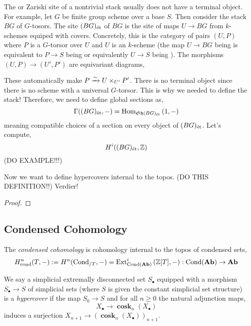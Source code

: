\documentclass[12pt]{article}
\newcommand{\cond}{\text{cond}}
\newcommand{\Cond}{\mathrm{Cond}}
\DeclareMathOperator{\bfcosk}{\mathbf{cosk}}
\begin{document}
\begin{example}
The \etale or Zariski site of a nontrivial stack usually does not have a terminal object. For example, let $G$ be finite \etale group scheme over a base $S$. Then consider the stack $BG$ of $G$-tosors. The \etale site $(BG)_{\text{\'{e}t}}$ of $BG$ is the site of \etale maps $U \to BG$ from $k$-schemes equiped with \etale covers. Concretely, this is the category of pairs $(U, P)$ where $P$ is a $G$-torsor over $U$ and $U$ is an \etale $k$-scheme (the map $U \to BG$ being \etale is equivalent to $P \to S$ being \etale or equivalently $U \to S$ being \etale). The morphisms $(U, P) \to (U', P')$ are equivariant diagrams,
\begin{center}
\end{center}
These automatically make $P \xrightarrow{\sim} U \times_{U'} P'$. There is no terminal object since there is no scheme with a universal $G$-torsor. This is why we needed to define the stack! Therefore, we need to define global sections as,
\[ \Gamma((BG)_{\text{\'{e}t}}, -) = \mathrm{Hom}_{\mathfrak{Sh}{(BG)_{\text{\'{e}t}}}} \left( 1, - \right) \]
meaning compatible choices of a section on every object of $(BG)_{\text{\'{e}t}}$. Let's compute,
\[ H^i((BG)_{\text{\'{e}t}}, \mathbb{Z}) \] 
(DO EXAMPLE!!!)
\end{example}

Now we want to define hypercovers internal to the topos. (DO THIS DEFINITION!!) Verdier!

\begin{proof}

\end{proof}


\subsection{Condensed Cohomology}

\newcommand{\CHaus}{\mathbf{CHaus}}

\begin{defn}
The \textit{condensed cohomology} is cohomology internal to the topos of condensed sets,
\[ H^n_{\cond}(T, -) := H^n(\Cond_{/T}, -) = \Ext{i}{\Cond(\Ab)}{\Z[T]}{-} : \Cond(\Ab) \to \Ab \]
\end{defn}


\begin{defn}
We say a simplicial extremally disconnected set $S_\bullet$ equipped with a morphism $S_\bullet \to S$ of simplicial sets (where $S$ is given the constant simplicial set structure) is a \textit{hypercover} if the map $S_0 \to S$ and for all $n \ge 0$ the natural adjunction maps,
\[ X_\bullet \to \bfcosk_n(X_\bullet) \]
induces a surjection $X_{n+1} \to (\bfcosk_n(X_\bullet))_{n+1}$. 
\end{defn}
\end{document}
